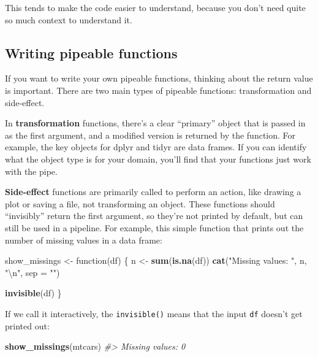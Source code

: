 \documentclass[]{book}
\newenvironment{Shaded}{\begin{snugshade}}{\end{snugshade}}
\newcommand{\KeywordTok}[1]{\textcolor[rgb]{0.13,0.29,0.53}{\textbf{{#1}}}}
\newcommand{\DataTypeTok}[1]{\textcolor[rgb]{0.13,0.29,0.53}{{#1}}}
\newcommand{\CharTok}[1]{\textcolor[rgb]{0.31,0.60,0.02}{{#1}}}
\newcommand{\StringTok}[1]{\textcolor[rgb]{0.31,0.60,0.02}{{#1}}}
\newcommand{\CommentTok}[1]{\textcolor[rgb]{0.56,0.35,0.01}{\textit{{#1}}}}
\newcommand{\NormalTok}[1]{{#1}}
\begin{document}
This tends to make the code easier to understand, because you don't need
quite so much context to understand it.

\subsection{Writing pipeable
functions}\label{writing-pipeable-functions}

If you want to write your own pipeable functions, thinking about the
return value is important. There are two main types of pipeable
functions: transformation and side-effect.

In \textbf{transformation} functions, there's a clear ``primary'' object
that is passed in as the first argument, and a modified version is
returned by the function. For example, the key objects for dplyr and
tidyr are data frames. If you can identify what the object type is for
your domain, you'll find that your functions just work with the pipe.

\textbf{Side-effect} functions are primarily called to perform an
action, like drawing a plot or saving a file, not transforming an
object. These functions should ``invisibly'' return the first argument,
so they're not printed by default, but can still be used in a pipeline.
For example, this simple function that prints out the number of missing
values in a data frame:

\begin{Shaded}
\begin{Highlighting}[]
\NormalTok{show_missings <-}\StringTok{ }\NormalTok{function(df) \{}
  \NormalTok{n <-}\StringTok{ }\KeywordTok{sum}\NormalTok{(}\KeywordTok{is.na}\NormalTok{(df))}
  \KeywordTok{cat}\NormalTok{(}\StringTok{"Missing values: "}\NormalTok{, n, }\StringTok{"}\CharTok{\textbackslash{}n}\StringTok{"}\NormalTok{, }\DataTypeTok{sep =} \StringTok{""}\NormalTok{)}
  
  \KeywordTok{invisible}\NormalTok{(df)}
\NormalTok{\}}
\end{Highlighting}
\end{Shaded}

If we call it interactively, the \texttt{invisible()} means that the
input \texttt{df} doesn't get printed out:

\begin{Shaded}
\begin{Highlighting}[]
\KeywordTok{show_missings}\NormalTok{(mtcars)}
\CommentTok{#> Missing values: 0}
\end{Highlighting}
\end{Shaded}
\end{document}

